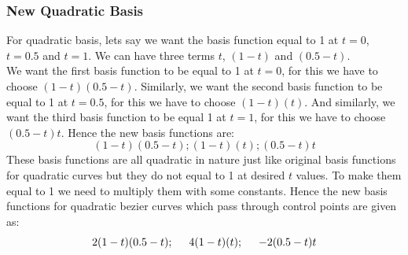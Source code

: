 \documentclass[a4paper, 11pt]{article}
\begin{document}
\begin{enumerate}
\begin{enumerate}[label=\alph*.]
    \subsubsection*{New Quadratic Basis}
    For quadratic basis, lets say we want the basis function equal to 1 at \(t=0\), \(t=0.5\) and \(t=1\). We can have three terms \(t\), \((1-t)\) and \((0.5-t)\). \\
    We want the first basis function to be equal to 1 at \(t=0\), for this we have to choose \((1-t)(0.5-t)\). Similarly, we want the second basis function to be equal to 1 at \(t=0.5\), for this we have to choose \((1-t)(t)\). And similarly, we want the third basis function to be equal 1 at \(t=1\), for this we have to choose \((0.5-t)t\). Hence the new basis functions are:
    \begin{equation}
        \label{quadraticNewBasis}
        (1-t)(0.5-t) ; (1-t)(t) ; (0.5-t)t
    \end{equation}
    These basis functions are all quadratic in nature just like original basis functions for quadratic curves but they do not equal to 1 at desired \(t\) values. To make them equal to 1 we need to multiply them with some constants. Hence the new basis functions for quadratic bezier curves which pass through control points are given as:
    \begin{equation}
        \label{quadraticNewBasis1}
        2(1-t)(0.5-t) ;\hspace{0.5cm} 4(1-t)(t) ; \hspace{0.5cm} -2(0.5-t)t
    \end{equation}

\end{enumerate}
\end{enumerate}
\end{document}
